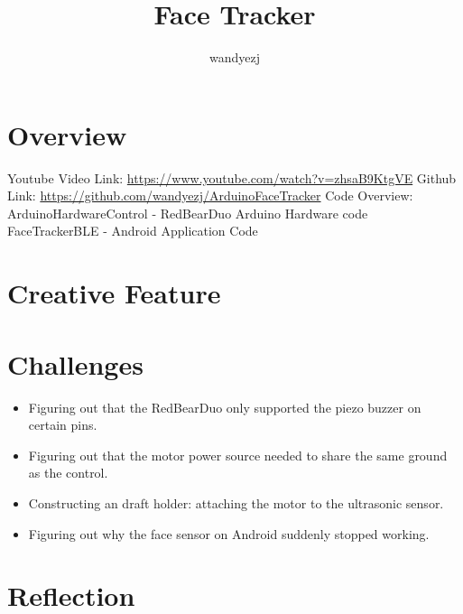 \documentclass{article}
\title{Face Tracker}
\author{wandyezj}
\begin{document}
	\maketitle
	\tableofcontents
	
	
	
	\clearpage
	
	\section{Overview}
	
	Youtube Video Link: \href{https://www.youtube.com/watch?v=zhsaB9KtgVE}{https://www.youtube.com/watch?v=zhsaB9KtgVE}\newline
	Github Link: \href{https://github.com/wandyezj/ArduinoFaceTracker}{https://github.com/wandyezj/ArduinoFaceTracker}\newline
	\newline
	Code Overview:
	\newline
	ArduinoHardwareControl - RedBearDuo Arduino Hardware code
	\newline
	FaceTrackerBLE - Android Application Code
	\newline
	\newline
	
	
	
	\section{Creative Feature}
	\section{Challenges}
	
	\begin{itemize}
		\item Figuring out that the RedBearDuo only supported the piezo buzzer on certain pins.
		\item Figuring out that the motor power source needed to share the same ground as the control.
		\item Constructing an draft holder: attaching the motor to the ultrasonic sensor.
		\item Figuring out why the face sensor on Android suddenly stopped working.
	\end{itemize}
	
	
	\section{Reflection}
	
\end{document}
